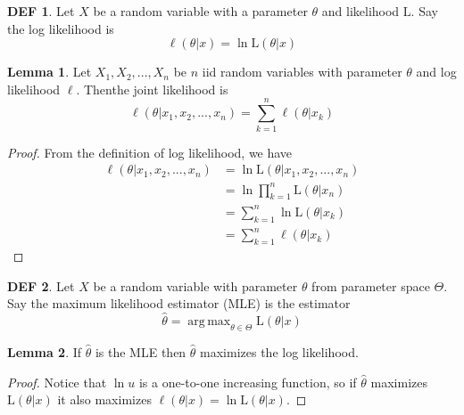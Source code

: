 \documentclass{article}
\theoremstyle{definition}\newtheorem{definition}{DEF}
\theoremstyle{definition}\newtheorem{example}{Ex}
\theoremstyle{lemma}\newtheorem{lemma}{Lemma}
\theoremstyle{corrolary}\newtheorem{corrolary}{Cor}
\DeclareMathOperator*{\argmax}{arg\,max}
\begin{document}
\begin{definition}
Let $X$ be a random variable with a parameter $\theta$ and likelihood ${\mathrm L}$.
Say the log likelihood is
\begin{equation}
\ell (\theta | x) = \ln {\mathrm L}(\theta | x)
\end{equation}
\end{definition}

\begin{lemma}
Let $X_1, X_2, ..., X_n$ be $n$ iid random variables with parameter $\theta$ and log likelihood $\ell$.
Thenthe joint likelihood is
\begin{equation}
\ell (\theta | x_1, x_2, ..., x_n) = \sum_{k=1}^n \ell (\theta | x_k)
\end{equation}
\end{lemma}
\begin{proof}
From the definition of log likelihood, we have
\begin{align*}
\ell(\theta | x_1, x_2, ..., x_n )
&= \ln {\mathrm L} (\theta | x_1, x_2, ..., x_n) \\
&= \ln \prod_{k=1}^n {\mathrm L} (\theta | x_n) \\
&= \sum_{k=1}^n \ln {\mathrm L} (\theta | x_k) \\
&= \sum_{k=1}^n \ell (\theta | x_k)
\end{align*}
\end{proof}

\begin{definition}\label{mle}
Let $X$ be a random variable with parameter $\theta$ from parameter space $\Theta$.
Say the maximum likelihood estimator (MLE) is the estimator
\begin{equation}
\hat{\theta} = \argmax_{\theta \in \Theta} {\mathrm L} (\theta | x)
\end{equation}
\end{definition}

\begin{lemma}
If $\hat{\theta}$ is the MLE then $\hat{\theta}$ maximizes the log likelihood.
\end{lemma}
\begin{proof}
Notice that $\ln u$ is a one-to-one increasing function, so if $\hat{\theta}$ maximizes ${\mathrm L} (\theta | x)$ it also maximizes $\ell (\theta | x) = \ln {\mathrm L} (\theta | x)$.
\end{proof}
\end{document}
